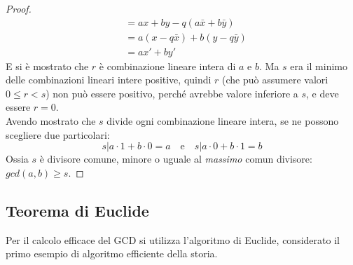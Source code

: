 \begin{theorem} 
\begin{proof}
\begin{align*}
            &= 
            ax + by - q\left( 
                a \bar{x} + b \bar{y}
            \right)
            \\
            &= 
            a \left( 
                x - q \bar{x}
            \right)
            +
            b \left( 
                y - q \bar{y}
            \right)
            \\
            &=
            ax' + by'
        \end{align*}
        E si è mostrato che $r$ è combinazione lineare intera di $a$ e $b$.
        Ma $s$ era il minimo delle combinazioni lineari intere positive, quindi $r$ (che può assumere valori $
            0 \leq r < s
        $) non può essere positivo, perché avrebbe valore inferiore a $s$, e deve essere $r=0$.
        \\
        Avendo mostrato che $s$ divide ogni combinazione lineare intera, se ne possono scegliere due particolari:
        \begin{equation*}
            s | a \cdot 1 + b \cdot 0 = a
            \quad
            \text{e}
            \quad
            s | a \cdot 0 + b \cdot 1 = b
        \end{equation*}
        Ossia $s$ è divisore comune, minore o uguale al \emph{massimo} comun divisore: $
        gcd(a,b) \geq s 
        $.
    \end{proof}
\end{theorem}

\subsection{Teorema di Euclide}

Per il calcolo efficace del GCD si utilizza l'algoritmo di Euclide, considerato il primo esempio di algoritmo efficiente della storia.


